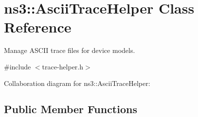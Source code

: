 \hypertarget{classns3_1_1AsciiTraceHelper}{}\section{ns3\+:\+:Ascii\+Trace\+Helper Class Reference}
\label{classns3_1_1AsciiTraceHelper}


Manage A\+S\+C\+II trace files for device models.  




{\ttfamily \#include $<$trace-\/helper.\+h$>$}



Collaboration diagram for ns3\+:\+:Ascii\+Trace\+Helper\+:
\subsection*{Public Member Functions}
